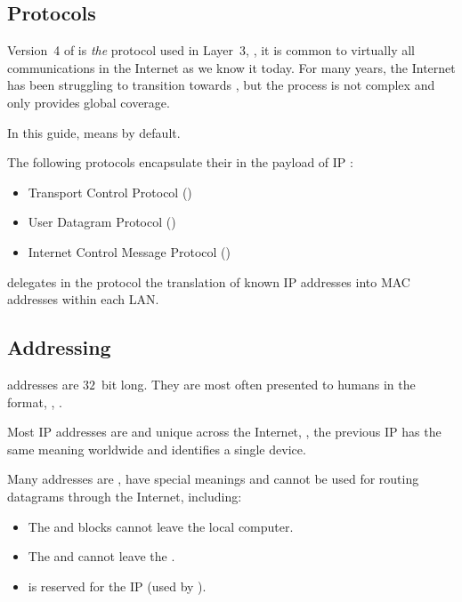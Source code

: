 \vspace{-0.25cm}
\subsection*{Protocols}

Version~4 of  is \textit{the} protocol used in Layer~3, \ie,
it is common to virtually all communications in the Internet as we know it today.
% 
For many years, the Internet has been struggling to transition towards , 
but the process is not complex and only  provides global coverage.

\begin{remark}
In this guide,  means  by default.
\end{remark}


The following protocols encapsulate their  in the payload of IP 
:\\[-0.6cm]
\begin{itemize}
\item Transport Control Protocol () 
\item User Datagram Protocol ()
\item Internet Control Message Protocol ()
\end{itemize}

 delegates in the  protocol the translation of known IP addresses 
into MAC addresses within each LAN.

\subsection*{Addressing}

 addresses are $32$~bit long. They are most often presented to humans in
the  format, \eg, . 

Most IP addresses are  and unique across the Internet, \ie, the previous IP 
has the same meaning worldwide and identifies a single device.

Many addresses are , have special meanings
and cannot be used for routing datagrams through the Internet, including:
\begin{itemize}
\item The  and  blocks cannot leave the local computer.
\item The  and  cannot leave the .
\item {} is reserved for the  IP 
(used by ).
\end{itemize}

